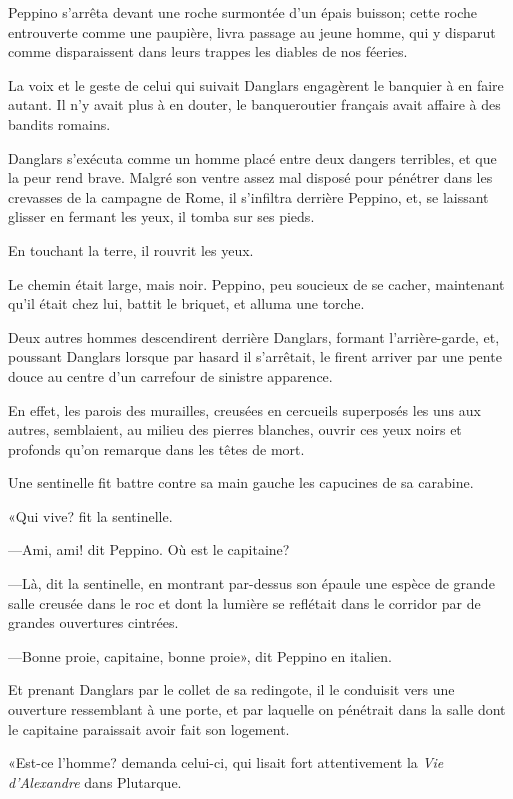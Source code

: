 Peppino s'arrêta devant une roche surmontée d'un épais buisson; cette roche entrouverte comme une paupière, livra passage au jeune homme, qui y disparut comme disparaissent dans leurs trappes les diables de nos féeries. 

La voix et le geste de celui qui suivait Danglars engagèrent le banquier à en faire autant. Il n'y avait plus à en douter, le banqueroutier français avait affaire à des bandits romains. 

Danglars s'exécuta comme un homme placé entre deux dangers terribles, et que la peur rend brave. Malgré son ventre assez mal disposé pour pénétrer dans les crevasses de la campagne de Rome, il s'infiltra derrière Peppino, et, se laissant glisser en fermant les yeux, il tomba sur ses pieds. 

En touchant la terre, il rouvrit les yeux. 

Le chemin était large, mais noir. Peppino, peu soucieux de se cacher, maintenant qu'il était chez lui, battit le briquet, et alluma une torche. 

Deux autres hommes descendirent derrière Danglars, formant l'arrière-garde, et, poussant Danglars lorsque par hasard il s'arrêtait, le firent arriver par une pente douce au centre d'un carrefour de sinistre apparence. 

En effet, les parois des murailles, creusées en cercueils superposés les uns aux autres, semblaient, au milieu des pierres blanches, ouvrir ces yeux noirs et profonds qu'on remarque dans les têtes de mort. 

Une sentinelle fit battre contre sa main gauche les capucines de sa carabine. 

«Qui vive? fit la sentinelle. 

—Ami, ami! dit Peppino. Où est le capitaine? 

—Là, dit la sentinelle, en montrant par-dessus son épaule une espèce de grande salle creusée dans le roc et dont la lumière se reflétait dans le corridor par de grandes ouvertures cintrées. 

—Bonne proie, capitaine, bonne proie», dit Peppino en italien. 

Et prenant Danglars par le collet de sa redingote, il le conduisit vers une ouverture ressemblant à une porte, et par laquelle on pénétrait dans la salle dont le capitaine paraissait avoir fait son logement. 

«Est-ce l'homme? demanda celui-ci, qui lisait fort attentivement la \textit{Vie d'Alexandre} dans Plutarque. 

